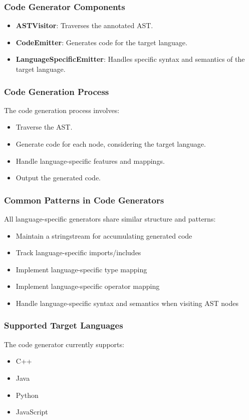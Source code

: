 \documentclass[conference]{IEEEtran}
\begin{document}
\subsubsection{Code Generator Components}
\begin{itemize}
    \item \textbf{ASTVisitor}: Traverses the annotated AST.
    \item \textbf{CodeEmitter}: Generates code for the target language.
    \item \textbf{LanguageSpecificEmitter}: Handles specific syntax and semantics of the target language.
\end{itemize}

\subsubsection{Code Generation Process}
The code generation process involves:
\begin{itemize}
    \item Traverse the AST.
    \item Generate code for each node, considering the target language.
    \item Handle language-specific features and mappings. %
    \item Output the generated code.
\end{itemize}

\subsubsection{Common Patterns in Code Generators}
All language-specific generators share similar structure and patterns:

\begin{itemize}
    \item Maintain a stringstream for accumulating generated code
    \item Track language-specific imports/includes
    \item Implement language-specific type mapping
    \item Implement language-specific operator mapping
    \item Handle language-specific syntax and semantics when visiting AST nodes
\end{itemize}

\subsubsection{Supported Target Languages} %
The code generator currently supports: %
\begin{itemize}
    \item C++
    \item Java
    \item Python
    \item JavaScript %
\end{itemize}
\end{document}
